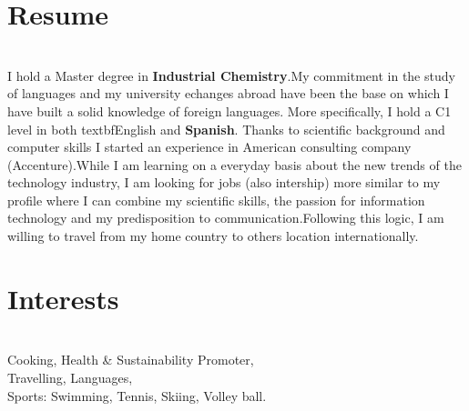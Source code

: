 \documentclass[]{twentysecondcv}
\begin{document}



\makeprofile

\section{Resume}
\vspace{2mm} %
\begin{small}
\\I hold a Master degree in \textbf{Industrial Chemistry}.My commitment in the study of languages and my university echanges abroad have been the base on which I have built a solid knowledge of foreign languages. More specifically, I hold a  C1 level in both textbf{English} and \textbf{Spanish}. Thanks to scientific background and computer skills I started an experience in American consulting company (Accenture).While I am learning on a everyday basis about the new trends of the technology industry, I am looking for jobs (also intership) more similar to my profile where I can combine my scientific skills, the passion for information technology and my predisposition to communication.Following this logic, I am willing to travel from my home country to others location internationally. 
\end{small}

\section{Interests}
\vspace{2mm} %
\begin{small}
\\ Cooking, Health \& Sustainability Promoter, \\Travelling, Languages,\\ Sports: Swimming, Tennis,  Skiing, Volley ball.
\end{small}
\vspace{2mm} %
\\
\end{document}
